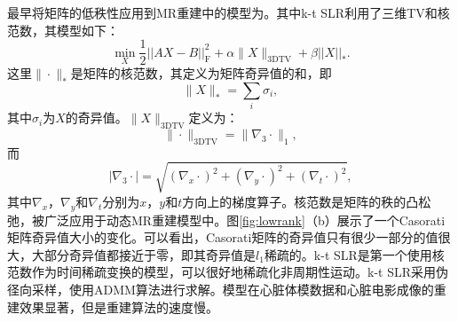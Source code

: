 最早将矩阵的低秩性应用到MR重建中的模型为\cite{zhao2012image,Sajan2011Accelerated}。其中k-t SLR\cite{Sajan2011Accelerated}利用了三维TV和核范数，其模型如下：
\begin{equation}
	\min_X \frac{1}{2}||AX-B||^2_\mathrm{F}+\alpha\|X\|_{\mathrm{3DTV}}+\beta||X||_*.
\end{equation}
这里$\|\cdot\|_*$是矩阵的核范数，其定义为矩阵奇异值的和，即
$$\|X\|_*=\sum_i\sigma_i,$$
其中$\sigma_i$为$X$的奇异值。$\|X\|_{\mathrm{3DTV}}$定义为：
$$\|\cdot\|_\mathrm{3DTV}=\|\nabla_3\cdot\|_1,$$
而
$$|\nabla_3\cdot|=\sqrt{(\nabla_x \cdot)^2 + (\nabla_y \cdot)^2+(\nabla_t \cdot)^2},$$
其中$\nabla_x$，$\nabla_y$和$\nabla_t$分别为$x$，$y$和$t$方向上的梯度算子。核范数是矩阵的秩的凸松弛，被广泛应用于动态MR重建模型中。图\ref{fig:lowrank}（b）展示了一个Casorati矩阵奇异值大小的变化。可以看出，Casorati矩阵的奇异值只有很少一部分的值很大，大部分奇异值都接近于零，即其奇异值是$l_1$稀疏的。k-t SLR是第一个使用核范数作为时间稀疏变换的模型，可以很好地稀疏化非周期性运动。k-t SLR采用伪径向采样，使用ADMM算法进行求解。模型在心脏体模数据和心脏电影成像的重建效果显著，但是重建算法的速度慢。

